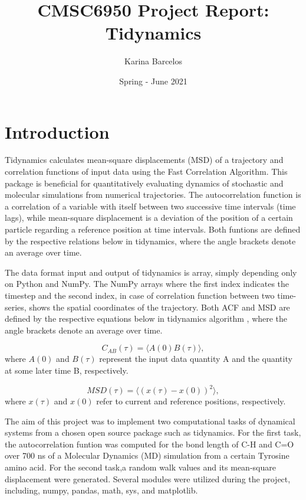 \documentclass{article}
\title{CMSC6950 Project Report: Tidynamics}
\author{Karina Barcelos}
\date{Spring - June 2021}
\begin{document}
\maketitle

\section{Introduction}

Tidynamics \cite{Buyl2018} calculates mean-square displacements (MSD) of a trajectory and correlation functions of input data using the Fast Correlation Algorithm. \cite{kneller1995nmoldyn} This package is beneficial for quantitatively evaluating dynamics of stochastic and molecular simulations from numerical trajectories. The autocorrelation function is a correlation of a variable with itself between two successive time intervals (time lags), while mean-square displacement is a deviation of the position of a certain particle regarding a reference position at time intervals. Both funtions are defined by the respective relations below in tidynamics, where the angle brackets denote an average over time. \cite{kneller1995nmoldyn}

The data format input and output of tidynamics \cite{Buyl2018} is array, simply depending only on Python and NumPy. The NumPy arrays where the first index indicates the timestep and the second index, in case of correlation function between two time-series, shows the spatial coordinates of the trajectory. Both ACF and MSD are defined by the respective equations below in tidynamics algorithm \cite{Buyl2018}, where the angle brackets denote an average over time. \cite{kneller1995nmoldyn}

\begin{equation}
C_{AB}(\tau) = \langle A(0) B(\tau) \rangle,
\label{correlation}
\end{equation}
where  $A(0)$ and $B(\tau)$ represent the input data quantity A and the quantity at some later time B, respectively.

\begin{equation}
MSD(\tau) = \langle (x(\tau) - x(0) )^2 \rangle,
\label{msd}
\end{equation}
where $x(\tau)$ and $x(0)$ refer to current and reference positions, respectively.

The aim of this project was to implement two computational tasks of dynamical systems from a chosen open source package such as tidynamics\cite{Buyl2018}. For the first task, the autocorrelation funtion was computed for the bond length of C-H and C=O over 700 ns of a Molecular Dynamics (MD) simulation from a certain Tyrosine amino acid. For the second task,a random walk values and its mean-square displacement were generated. Several modules were utilized during the project, including, numpy, pandas, math, sys, and matplotlib. 
\end{document}
